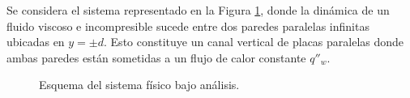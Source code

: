 Se considera el sistema representado en la Figura \ref{fig:sistem_domain}, donde la dinámica de un fluido viscoso e incompresible sucede entre dos paredes paralelas infinitas ubicadas en $y=\pm d$. Esto constituye un canal vertical de placas paralelas donde ambas paredes están sometidas a un flujo de calor constante $q''_w$.

\begin{figure}[H]
 \centering
 \caption{Esquema del sistema físico bajo análisis.} 
 \label{fig:sistem_domain}
\end{figure}

